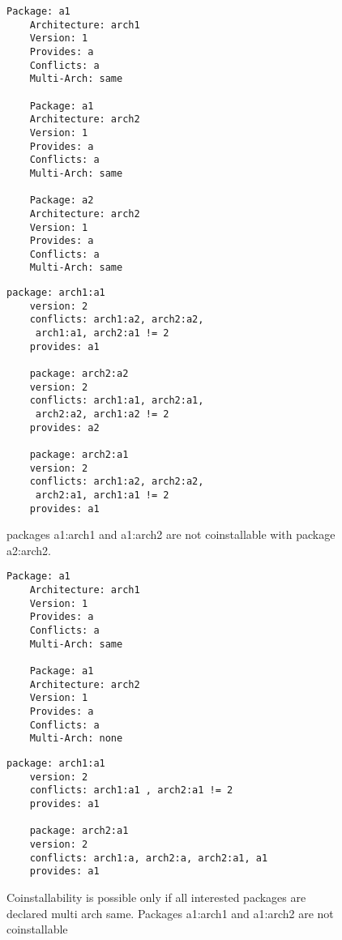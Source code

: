 \begin{figure}[h]
  \begin{minipage}[b]{0.45\linewidth}
    \begin{lstlisting}[style=debctrl]
    Package: a1
    Architecture: arch1
    Version: 1
    Provides: a
    Conflicts: a
    Multi-Arch: same

    Package: a1
    Architecture: arch2
    Version: 1
    Provides: a
    Conflicts: a
    Multi-Arch: same

    Package: a2
    Architecture: arch2
    Version: 1
    Provides: a
    Conflicts: a
    Multi-Arch: same
    \end{lstlisting}
  \end{minipage}
  \begin{minipage}[b]{0.45\linewidth}
    \begin{lstlisting}[style=cudf]
    package: arch1:a1
    version: 2
    conflicts: arch1:a2, arch2:a2, 
     arch1:a1, arch2:a1 != 2
    provides: a1 

    package: arch2:a2
    version: 2
    conflicts: arch1:a1, arch2:a1, 
     arch2:a2, arch1:a2 != 2
    provides: a2

    package: arch2:a1
    version: 2
    conflicts: arch1:a2, arch2:a2, 
     arch2:a1, arch1:a1 != 2
    provides: a1
    \end{lstlisting}
  \end{minipage}
\caption{packages a1:arch1 and a1:arch2 are not coinstallable with
package a2:arch2.}
\label{fig:arch-same-3}
\end{figure}

\begin{figure}[h]
  \begin{minipage}[b]{0.45\linewidth}
    \begin{lstlisting}[style=debctrl]
    Package: a1
    Architecture: arch1
    Version: 1
    Provides: a
    Conflicts: a
    Multi-Arch: same

    Package: a1
    Architecture: arch2
    Version: 1
    Provides: a
    Conflicts: a
    Multi-Arch: none
    \end{lstlisting}
  \end{minipage}
  \begin{minipage}[b]{0.45\linewidth}
    \begin{lstlisting}[style=cudf]
    package: arch1:a1
    version: 2
    conflicts: arch1:a1 , arch2:a1 != 2
    provides: a1

    package: arch2:a1
    version: 2
    conflicts: arch1:a, arch2:a, arch2:a1, a1
    provides: a1
    \end{lstlisting}
  \end{minipage}
\caption{Coinstallability is possible only if all interested packages
are declared multi arch same.  Packages a1:arch1 and a1:arch2 are not
coinstallable}
\label{fig:arch-same-4}
\end{figure}

